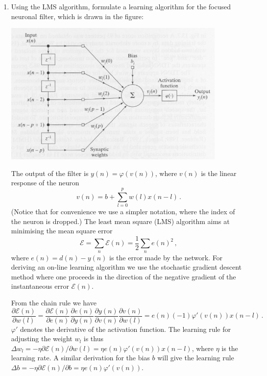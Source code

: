 \begin{enumerate}
\item Using the LMS algorithm, formulate a learning algorithm for the
  focused neuronal filter, which is drawn in the figure:
    \begin{center}
      \includegraphics[width=11cm]{l12k3a}
    \end{center}


  \begin{solution}

    The output of the filter is $y(n) =
    \varphi(v(n))$, where $v(n)$ is the linear response of the neuron $$v(n) = b +
    \sum_{l=0}^p w(l) x(n-l) \, .$$ (Notice that for convenience we use
    a simpler notation, where the index of the neuron is dropped.)
    The least mean square (LMS) algorithm aims at minimising the mean
    square error $$\mathcal{E} = \sum_n \mathcal{E}(n) = \frac{1}{2} \sum_n e(n)^2 \, ,$$
    where $e(n) = d(n) - y(n)$ is the error made by the network.  For deriving an
    on-line learning algorithm we  use the stochastic
    gradient descent method where one proceeds in the direction of the negative
    gradient of the instantaneous
    error $\mathcal{E}(n)$.

    From the chain rule we have $$\frac{\partial \mathcal{E}(n)}{\partial w(l)} =
    \frac{\partial \mathcal{E}(n)}{\partial e(n)} \frac{\partial e(n)}{\partial
      y(n)} \frac{\partial y(n)}{\partial v(n)} \frac{\partial
      v(n)}{\partial w(l)} = e(n) (-1) \varphi'(v(n)) x(n-l) \, .$$ 
    $\varphi'$ denotes the derivative of the activation function.
    The
    learning rule for adjusting the weight $w_l$ is thus $\Delta w_l = -\eta \partial \mathcal{E}(n) / \partial
    w(l) = \eta e(n) \varphi'(v(n)) x(n-l)$, where $\eta$ is the learning
    rate.  A similar derivation for the bias $b$ will give the learning
    rule $\Delta b = - \eta \partial \mathcal{E}(n) / \partial b = \eta e(n)
    \varphi'(v(n))$.


\end{solution}
\end{enumerate}
